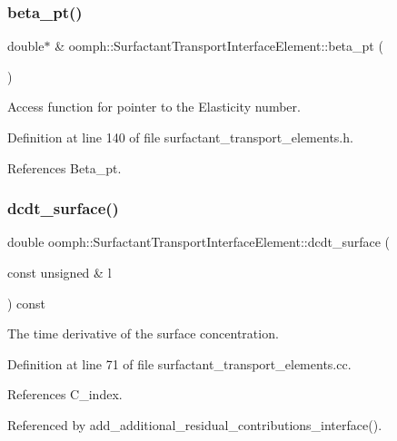 \subsubsection{\texorpdfstring{beta\+\_\+pt()}{beta\_pt()}}
{\footnotesize\ttfamily double$\ast$ \& oomph\+::\+Surfactant\+Transport\+Interface\+Element\+::beta\+\_\+pt (\begin{DoxyParamCaption}{ }\end{DoxyParamCaption})\hspace{0.3cm}{\ttfamily [inline]}}



Access function for pointer to the Elasticity number. 



Definition at line 140 of file surfactant\+\_\+transport\+\_\+elements.\+h.



References Beta\+\_\+pt.

\mbox{\label{classoomph_1_1SurfactantTransportInterfaceElement_a7b5cc851b94d836a3caa2130cbf45bec}} 
\subsubsection{\texorpdfstring{dcdt\+\_\+surface()}{dcdt\_surface()}}
{\footnotesize\ttfamily double oomph\+::\+Surfactant\+Transport\+Interface\+Element\+::dcdt\+\_\+surface (\begin{DoxyParamCaption}\item[{const unsigned \&}]{l }\end{DoxyParamCaption}) const\hspace{0.3cm}{\ttfamily [protected]}}



The time derivative of the surface concentration. 



Definition at line 71 of file surfactant\+\_\+transport\+\_\+elements.\+cc.



References C\+\_\+index.



Referenced by add\+\_\+additional\+\_\+residual\+\_\+contributions\+\_\+interface().

